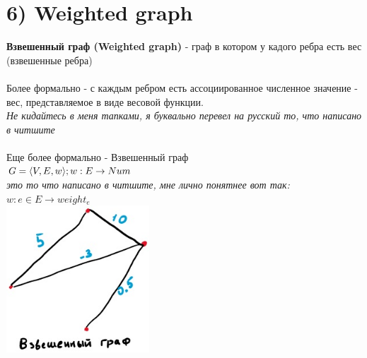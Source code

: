 \documentclass[../TM3-UltraDoc.tex]{subfiles}
\begin{document}
	\section*{6) Weighted graph}
	\textbf{Взвешенный граф (Weighted graph)} - граф в котором у кадого ребра есть вес (взвешенные ребра)\\
	\\
	Более формально - с каждым ребром есть ассоциированное численное значение - вес, представляемое в виде весовой функции.\\
	\textit{Не кидайтесь в меня тапками, я буквально перевел на русский то, что написано в читшите}\\
	\\
	Еще более формально - Взвешенный граф\\ 
	\(G = \langle V, E, w \rangle; \\ w: E \rightarrow Num\) \\
	\textit{это то что написано в читшите, мне лично понятнее вот так:}\\
	\(w: e \in E \rightarrow weight_e\)\\
	\includegraphics[width = 0.4\textwidth]{6.1}
\end{document}
